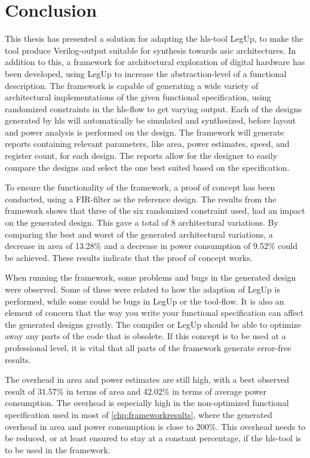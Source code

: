 \chapter{Conclusion}
\label{chp:conclusion} 
This thesis has presented a solution for adapting the \gls{hls}-tool LegUp, to make the tool produce Verilog-output suitable for synthesis towards \gls{asic} architectures. In addition to this, a framework for architectural exploration of digital hardware has been developed, using LegUp to increase the abstraction-level of a functional description. The framework is capable of generating a wide variety of architectural implementations of the given functional specification, using randomized constraints in the \gls{hls}-flow to get varying output. Each of the designs generated by \gls{hls} will automatically be simulated and synthesized, before layout and power analysis is performed on the design. The framework will generate reports containing relevant parameters, like area, power estimates, speed, and register count, for each design. The reports allow for the designer to easily compare the designs and select the one best suited based on the specification.

To ensure the functionality of the framework, a proof of concept has been conducted, using a FIR-filter as the reference design. The results from the framework shows that three of the six randomized constraint used, had an impact on the generated design. This gave a total of 8 architectural variations. By comparing the best and worst of the generated architectural variations, a decrease in area of 13.28\% and a decrease in power consumption of 9.52\% could be achieved. These results indicate that the proof of concept works.

When running the framework, some problems and bugs in the generated design were observed. Some of these were related to how the adaption of LegUp is performed, while some could be bugs in LegUp or the tool-flow. It is also an element of concern that the way you write your functional specification can affect the generated designs greatly. The compiler or LegUp should be able to optimize away any parts of the code that is obsolete. If this concept is to be used at a professional level, it is vital that all parts of the framework generate error-free results. 

The overhead in area and power estimates are still high, with a best observed result of 31.57\% in terms of area and 42.02\% in terms of average power consumption. The overhead is especially high in the non-optimized functional specification used in most of \cref{chp:frameworkresults}, where the generated overhead in area and power consumption is close to 200\%. This overhead needs to be reduced, or at least ensured to stay at a constant percentage, if the \gls{hls}-tool is to be used in the framework.

